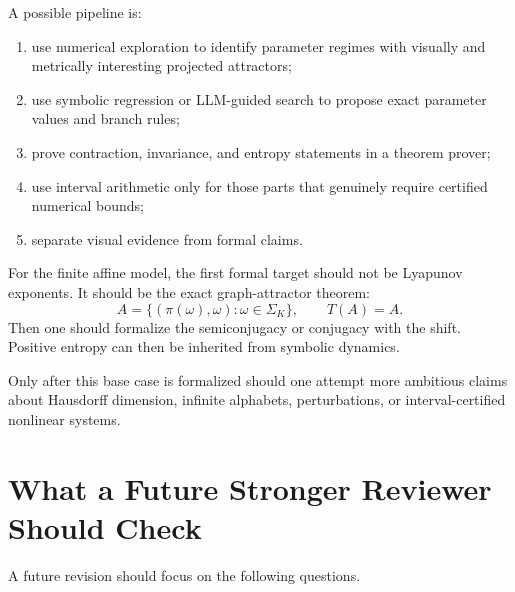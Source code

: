 \documentclass[12pt]{article}
\begin{document}
	A possible pipeline is:
	
	\begin{enumerate}
		\item use numerical exploration to identify parameter regimes with visually and metrically interesting projected attractors;
		\item use symbolic regression or LLM-guided search to propose exact parameter values and branch rules;
		\item prove contraction, invariance, and entropy statements in a theorem prover;
		\item use interval arithmetic only for those parts that genuinely require certified numerical bounds;
		\item separate visual evidence from formal claims.
	\end{enumerate}
	
	For the finite affine model, the first formal target should not be Lyapunov exponents. It should be the exact graph-attractor theorem:
	\[
	A=\{(\pi(\omega),\omega):\omega\in\Sigma_K\},
	\qquad
	T(A)=A.
	\]
	Then one should formalize the semiconjugacy or conjugacy with the shift. Positive entropy can then be inherited from symbolic dynamics.
	
	Only after this base case is formalized should one attempt more ambitious claims about Hausdorff dimension, infinite alphabets, perturbations, or interval-certified nonlinear systems.
	
	\section{What a Future Stronger Reviewer Should Check}
	
	A future revision should focus on the following questions.
	
\end{document}
